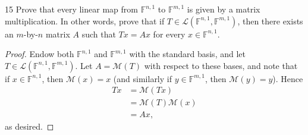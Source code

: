 \documentclass{extarticle}
\newenvironment{problem}[1]{\begin{prob*}{#1}{}}{\end{prob*}}
\newcommand{\F}{\mathbb{F}}
\newcommand{\mat}{\mathcal{M}}
\newcommand{\Hom}{\mathcal{L}}
\begin{document}
\begin{problem}{15}
Prove that every linear map from $\F^{n,1}$ to $\F^{m,1}$ is given by a matrix multiplication.  In other words, prove that if $T\in\Hom(\F^{n,1}, \F^{m,1})$, then there exists an $m$-by-$n$ matrix $A$ such that $Tx=Ax$ for every $x\in\F^{n,1}$.
\end{problem}
\begin{proof}
Endow both $\F^{n,1}$ and $\F^{m,1}$ with the standard basis, and let $T\in\Hom(\F^{n,1}, \F^{m,1})$.  Let $A=\mat(T)$ with respect to these bases, and note that if $x\in\F^{n,1}$, then $\mat(x) = x$ (and similarly if $y\in\F^{m,1}$, then $\mat(y) = y$).  Hence
\begin{align*}
Tx &= \mat(Tx)\\
&= \mat(T)\mat(x)\\
&= Ax,
\end{align*}
as desired.
\end{proof}
\end{document}
